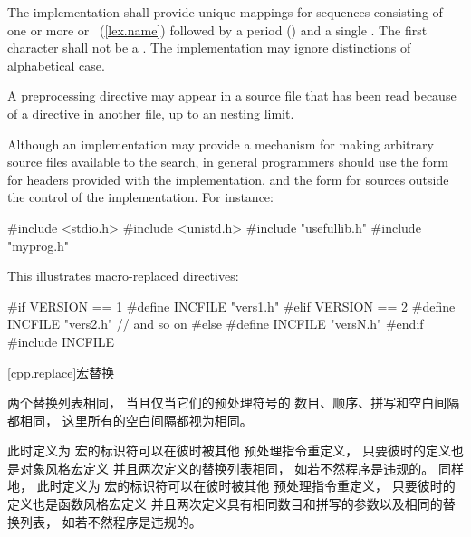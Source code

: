 \pnum
The implementation shall provide unique mappings for
sequences consisting of one or more
 or ~(\ref{lex.name})
followed by a period
()
and a single
.
The first character shall not be a .
The implementation may ignore distinctions of alphabetical case.

\pnum
A
preprocessing directive may appear
in a source file that has been read because of a
directive in another file,
up to an  nesting limit.

\pnum
\enternote
Although an implementation may provide a mechanism for making arbitrary
source files available to the \tcode{< >} search, in general
programmers should use the \tcode{< >} form for headers provided
with the implementation, and the  form for sources
outside the control of the implementation. For instance:

\begin{codeblock}
#include <stdio.h>
#include <unistd.h>
#include "usefullib.h"
#include "myprog.h"
\end{codeblock}

\exitnote

\pnum
\enterexample
This illustrates macro-replaced
directives:

\begin{codeblock}
#if VERSION == 1
    #define INCFILE  "vers1.h"
#elif VERSION == 2
    #define INCFILE  "vers2.h"   // and so on
#else
    #define INCFILE  "versN.h"
#endif
#include INCFILE
\end{codeblock}
\exitexample

[cpp.replace]{宏替换}%
%
%

\pnum
{}%
两个替换列表相同，
当且仅当它们的预处理符号的
数目、顺序、拼写和空白间隔都相同，
这里所有的空白间隔都视为相同。

\pnum
此时定义为
%
%
宏的标识符可以在彼时被其他
预处理指令重定义，
只要彼时的定义也是对象风格宏定义
并且两次定义的替换列表相同，
如若不然程序是违规的。
同样地，
此时定义为
%
%
宏的标识符可以在彼时被其他
预处理指令重定义，
只要彼时的定义也是函数风格宏定义
并且两次定义具有相同数目和拼写的参数以及相同的替换列表，
如若不然程序是违规的。

